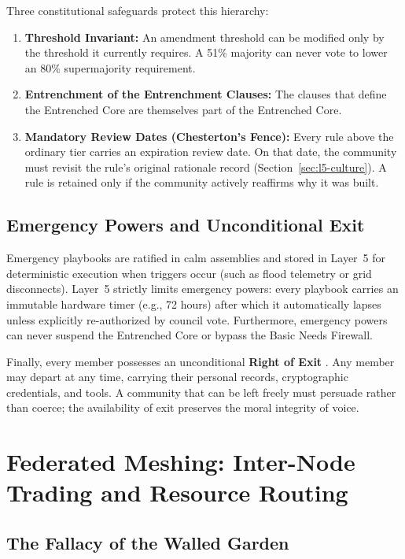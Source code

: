 Three constitutional safeguards protect this hierarchy:
\begin{enumerate}
  \item \textbf{Threshold Invariant:} An amendment threshold can be modified only by the threshold it currently requires. A 51\% majority can never vote to lower an 80\% supermajority requirement.
  \item \textbf{Entrenchment of the Entrenchment Clauses:} The clauses that define the Entrenched Core are themselves part of the Entrenched Core.
  \item \textbf{Mandatory Review Dates (Chesterton's Fence):} Every rule above the ordinary tier carries an expiration review date. On that date, the community must revisit the rule's original rationale record (Section~\ref{sec:l5-culture}). A rule is retained only if the community actively reaffirms why it was built.
\end{enumerate}

\subsection{Emergency Powers and Unconditional Exit}

Emergency playbooks are ratified in calm assemblies and stored in Layer~5 for deterministic execution when triggers occur (such as flood telemetry or grid disconnects). Layer~5 strictly limits emergency powers: every playbook carries an immutable hardware timer (e.g., 72 hours) after which it automatically lapses unless explicitly re-authorized by council vote. Furthermore, emergency powers can never suspend the Entrenched Core or bypass the Basic Needs Firewall.

Finally, every member possesses an unconditional \textbf{Right of Exit} \parencite{hirschman1970}. Any member may depart at any time, carrying their personal records, cryptographic credentials, and tools. A community that can be left freely must persuade rather than coerce; the availability of exit preserves the moral integrity of voice.

\section{Federated Meshing: Inter-Node Trading and Resource Routing}
\label{sec:l5-federation}

\subsection{The Fallacy of the Walled Garden}

